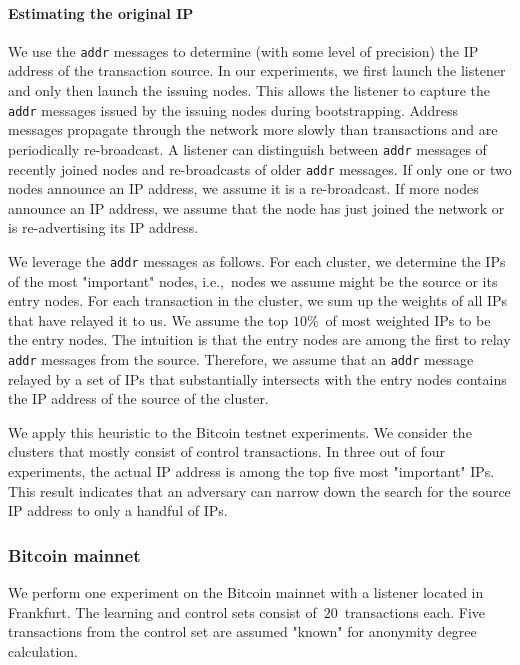 \paragraph{Estimating the original IP}

We use the \texttt{addr} messages to determine (with some level of precision) the IP address of the transaction source.
In our experiments, we first launch the listener and only then launch the issuing nodes.
This allows the listener to capture the \texttt{addr} messages issued by the issuing nodes during bootstrapping.
Address messages propagate through the network more slowly than transactions and are periodically re-broadcast.
A listener can distinguish between \texttt{addr} messages of recently joined nodes and re-broadcasts of older \texttt{addr} messages.
If only one or two nodes announce an IP address, we assume it is a re-broadcast.
If more nodes announce an IP address, we assume that the node has just joined the network or is re-advertising its IP address.

We leverage the \texttt{addr} messages as follows.
For each cluster, we determine the IPs of the most "important" nodes, i.e.,~nodes we assume might be the source or its entry nodes.
For each transaction in the cluster, we sum up the weights of all IPs that have relayed it to us.
We assume the top $10\%$~of most weighted IPs to be the entry nodes.
The intuition is that the entry nodes are among the first to relay \texttt{addr} messages from the source.
Therefore, we assume that an \texttt{addr} message relayed by a set of IPs that substantially intersects with the entry nodes contains the IP address of the source of the cluster.

We apply this heuristic to the Bitcoin testnet experiments.
We consider the clusters that mostly consist of control transactions.
In three out of four experiments, the actual IP address is among the top five most "important" IPs.
This result indicates that an adversary can narrow down the search for the source IP address to only a handful of IPs.

\subsubsection{Bitcoin mainnet}

We perform one experiment on the Bitcoin mainnet with a listener located in Frankfurt.
The learning and control sets consist of~$20$~transactions each.
Five transactions from the control set are assumed "known" for anonymity degree calculation.

